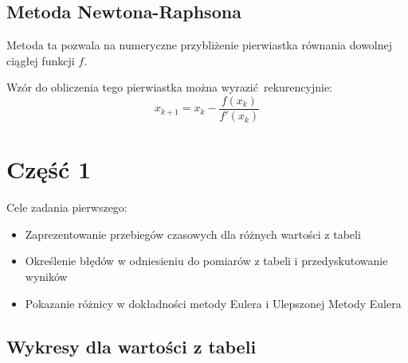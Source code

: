\documentclass[varwidth,12pt,a4paper]{article}
\begin{document}


\subsection{Metoda Newtona-Raphsona}

Metoda ta pozwala na numeryczne przybliżenie pierwiastka równania dowolnej ciągłej funkcji $f$.

Wzór do obliczenia tego pierwiastka można wyrazić rekurencyjnie:
\begin{equation}
    x_{k+1} = x_k - \frac{f(x_k)}{f'(x_k)}
\end{equation}

\section{Część 1}

Cele zadania pierwszego:

\begin{itemize}
  \item Zaprezentowanie przebiegów czasowych dla różnych wartości z tabeli
  \item Określenie błędów w odniesieniu do pomiarów z tabeli i przedyskutowanie wyników
  \item Pokazanie różnicy w dokładności metody Eulera i Ulepszonej Metody Eulera
\end{itemize}

\subsection{Wykresy dla wartości z tabeli}
\end{document}
